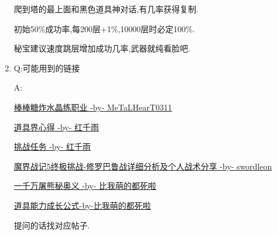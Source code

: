 \begin{enumerate}
	爬到塔的最上面和黑色道具神对话,有几率获得复制.

	初始50\%成功率,每200层+1\%,10000层时必定100\%.

	秘宝建议速度跳层增加成功几率,武器就纯看脸吧.

	\item
	Q:可能用到的链接

	A:

	\href{http://tieba.baidu.com/p/3717431968}{棒棒糖炸水晶练职业 -by- MeTaLHearT0311}

	\href{http://tieba.baidu.com/p/3730196003}{道具界心得 -by- 红千雨}

	\href{http://tieba.baidu.com/p/3723862919}{挑战任务 -by- 红千雨}

	\href{http://tieba.baidu.com/p/3949061316}{魔界战记5终极挑战-修罗巴鲁战详细分析及个人战术分享 -by- swordleon}

	\href{http://tieba.baidu.com/p/3825275063}{一千万屠熊秘奥义 -by- 比我萌的都死啦}

	\href{http://tieba.baidu.com/f?kz=3834692385}{道具能力成长公式-by-比我萌的都死啦}

	提问的话找对应帖子.

\end{enumerate}
